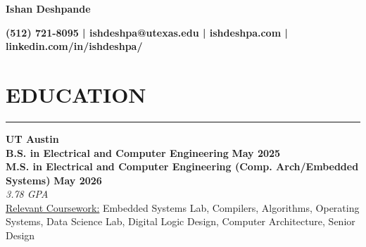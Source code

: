 \documentclass{article}
\newcommand{\sectionHeader}[1]{%
    \vspace{-1.5\baselineskip}
    \section*{\MakeUppercase{\large #1}} %
    \vspace{-1.75\baselineskip} %
    \color{teal}
    \rule{\textwidth}{2pt} %
    \color{black}
    \vspace{-1.5\baselineskip}
}
\begin{document}
\begin{center}
    \textbf{\LARGE Ishan Deshpande}
\end{center}

\begin{center}
    \textbf{\small (512) 721-8095 | ishdeshpa@utexas.edu | ishdeshpa.com | linkedin.com/in/ishdeshpa/}
\end{center}

\sectionHeader{education}       
\begin{flushleft}
    \vspace{2.5pt}
    \textbf{\large UT Austin} \\
    \textbf{B.S. in Electrical and Computer Engineering} \hfill \textbf{May 2025} \\
    \textbf{M.S. in Electrical and Computer Engineering (Comp. Arch/Embedded Systems)} \hfill \textbf{May 2026} \\
    \textit{3.78 GPA} \\
    \underline{Relevant Coursework:} Embedded Systems Lab, Compilers, Algorithms, Operating Systems, Data Science Lab, Digital Logic Design, Computer Architecture, Senior Design
\end{flushleft}
\end{document}
